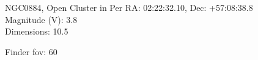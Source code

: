 \begin{block}{NGC0884, Open Cluster in Per}
    RA: 02:22:32.10, Dec: +57:08:38.8 \\ 
    Magnitude (V): 3.8 \\ 
    Dimensions: 10.5 

    Finder fov: 60 
\end{block}
